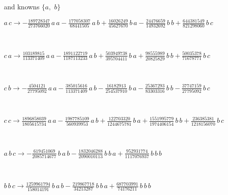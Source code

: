 \documentclass[rep10,leqno]{report}
\begin{document}
and knowns $\{a,
$ $
b\}$\smallskip\\
\begin{minipage}{6in}
$
a\,
 c\rightarrow -\frac{189728347}{273766020}\,
 a\,
 a - \frac{177058307}{68441505}\,
 a\,
 b + \frac{16026249}{45627670}\,
 b\,
 a - \frac{24476659}{14932692}\,
 b\,
 b + \frac{644381549}{821298060}\,
 b\,
 c
$
\end{minipage}\medskip \\
\begin{minipage}{6in}
$
c\,
 a\rightarrow \frac{103189815}{113371409}\,
 a\,
 a - \frac{1891122719}{1187113233}\,
 a\,
 b + \frac{503949738}{395704411}\,
 b\,
 a + \frac{98555989}{20825829}\,
 b\,
 b + \frac{50035378}{71678771}\,
 b\,
 c
$
\end{minipage}\medskip \\
\begin{minipage}{6in}
$
c\,
 b\rightarrow -\frac{4504121}{27795092}\,
 a\,
 a - \frac{385015616}{113371409}\,
 a\,
 b - \frac{16182913}{254537910}\,
 b\,
 a - \frac{25367293}{83303316}\,
 b\,
 b - \frac{37747159}{27795092}\,
 b\,
 c
$
\end{minipage}\medskip \\
\begin{minipage}{6in}
$
c\,
 c\rightarrow \frac{1896858039}{1805615734}\,
 a\,
 a - \frac{1987785109}{560939953}\,
 a\,
 b + \frac{122703320}{1244675781}\,
 b\,
 a + \frac{1551995779}{1974406154}\,
 b\,
 b + \frac{236385381}{1218156070}\,
 b\,
 c
$
\end{minipage}\medskip \\
\begin{minipage}{6in}
$
a\,
 b\,
 c\rightarrow -\frac{619451069}{2085714677}\,
 b\,
 a\,
 b - \frac{1832046288}{2090010113}\,
 b\,
 b\,
 a + \frac{952931774}{1117076937}\,
 b\,
 b\,
 b
$
\end{minipage}\medskip \\
\begin{minipage}{6in}
$
b\,
 b\,
 c\rightarrow \frac{1259961794}{158014191}\,
 b\,
 a\,
 b - \frac{219867718}{34213287}\,
 b\,
 b\,
 a + \frac{687703991}{74176211}\,
 b\,
 b\,
 b
$
\end{minipage}\\
\vspace{10pt}
\end{document}
